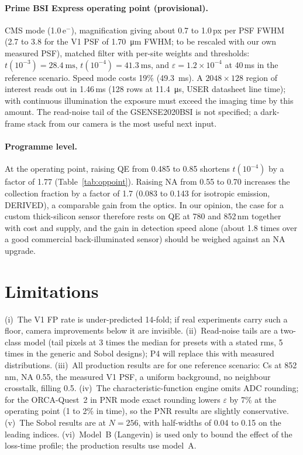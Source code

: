 \documentclass[11pt,a4paper]{article}
\newcommand{\eps}{\varepsilon}
\newcommand{\elec}{e$^-$}
\begin{document}
\paragraph{Prime BSI Express operating point (provisional).} CMS mode (1.0\,\elec), magnification giving
about 0.7 to 1.0\,px per PSF FWHM (2.7 to 3.8 for the V1 PSF of \SI{1.70}{\micro\metre} FWHM; to be
rescaled with our own measured PSF), matched filter with per-site weights and thresholds:
$t(10^{-3}) = \SI{28.4}{\milli\second}$, $t(10^{-4}) = \SI{41.3}{\milli\second}$, and
$\eps = 1.2\times10^{-4}$ at 40\,ms in the reference scenario. Speed mode costs 19\%
(\SI{49.3}{\milli\second}). A $2048\times128$ region of interest reads out in 1.46\,ms (128 rows at
\SI{11.4}{\micro\second}, USER datasheet line time); with continuous illumination the exposure must
exceed the imaging time by this amount. The read-noise tail of the GSENSE2020BSI is not specified; a
dark-frame stack from our camera is the most useful next input.

\paragraph{Programme level.} At the operating point, raising QE from 0.485 to 0.85 shortens
$t(10^{-4})$ by a factor of 1.77 (Table~\ref{tab:oppoint}). Raising NA from 0.55 to 0.70 increases the
collection fraction by a factor of 1.7 (0.083 to 0.143 for isotropic emission, DERIVED), a comparable
gain from the optics. In our opinion, the case for a custom thick-silicon sensor therefore rests on QE
at 780 and 852\,nm together with cost and supply, and the gain in detection speed alone (about 1.8 times
over a good commercial back-illuminated sensor) should be weighed against an NA upgrade.

\section{Limitations}

(i)~The V1 FP rate is under-predicted 14-fold; if real experiments carry such a floor, camera
improvements below it are invisible. (ii)~Read-noise tails are a two-class model (tail pixels at 3 times
the median for presets with a stated rms, 5 times in the generic and Sobol designs); P4 will replace
this with measured distributions. (iii)~All production results are for one reference scenario: Cs at
852\,nm, NA 0.55, the measured V1 PSF, a uniform background, no neighbour crosstalk, filling 0.5.
(iv)~The characteristic-function engine omits ADC rounding; for the ORCA-Quest~2 in PNR mode exact
rounding lowers $\eps$ by 7\% at the operating point (1 to 2\% in time), so the PNR results are slightly
conservative. (v)~The Sobol results are at $N = 256$, with half-widths of 0.04 to 0.15 on the leading
indices. (vi)~Model~B (Langevin) is used only to bound the effect of the loss-time profile; the
production results use model~A.
\end{document}
